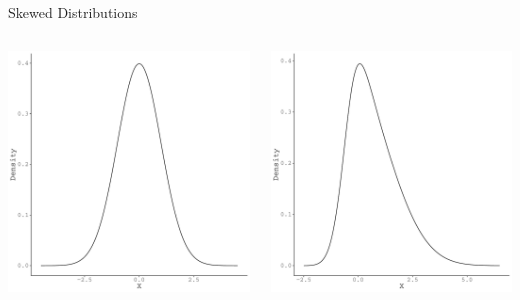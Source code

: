 \documentclass{beamer}\usepackage[]{graphicx}\usepackage[]{color}
\makeatletter
\def\maxwidth{ %
  \ifdim\Gin@nat@width>\linewidth
    \linewidth
  \else
    \Gin@nat@width
  \fi
}
\newenvironment{knitrout}{}{} %
\makeatother
\begin{document}
\begin{frame}{Skewed Distributions}
  
  \begin{columns}
    \begin{column}{0.5\textwidth}
  
\begin{knitrout}\footnotesize
{}\color{fgcolor}

{\centering \includegraphics[width=\maxwidth]{figure/unnamed-chunk-24-1} 

}



\end{knitrout}

    \end{column}
    
    \begin{column}{0.5\textwidth}
        
\begin{knitrout}\footnotesize
{}\color{fgcolor}

{\centering \includegraphics[width=0.6\linewidth]{figure/unnamed-chunk-25-1} 

}
\end{knitrout}
\end{column}
\end{columns}
\end{frame}
\end{document}

